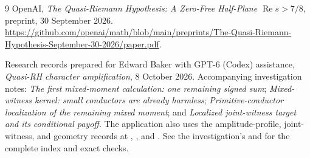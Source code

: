\documentclass[11pt]{article}
\theoremstyle{definition}
\theoremstyle{remark}
\numberwithin{equation}{section}
\newcommand{\Rea}{\operatorname{Re}}
\begin{document}
\begin{thebibliography}{9}
OpenAI,
\emph{The Quasi-Riemann Hypothesis: A Zero-Free Half-Plane
$\Rea s>7/8$},
preprint, 30 September 2026.
\url{https://github.com/openai/math/blob/main/preprints/The-Quasi-Riemann-Hypothesis-September-30-2026/paper.pdf}.

Research records prepared for Edward Baker with GPT-6 (Codex)
assistance, \emph{Quasi-RH character amplification},
8 October 2026. Accompanying investigation notes:
\emph{The first mixed-moment calculation: one remaining signed sum};
\emph{Mixed-witness kernel: small conductors are already harmless};
\emph{Primitive-conductor localization of the remaining mixed moment};
and \emph{Localized joint-witness target and its conditional payoff}.
The application also uses the amplitude-profile, joint-witness, and
geometry records at
,
, and
.
See the investigation's  and
 for the complete index and exact checks.
\end{thebibliography}
\end{document}
